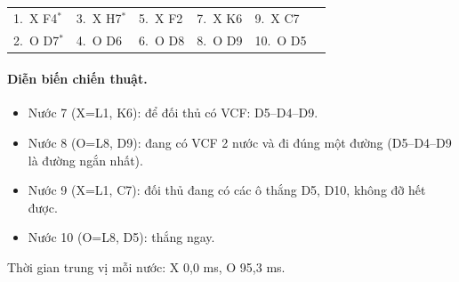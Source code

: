 {\footnotesize\linespread{1}\selectfont
\noindent\begin{tabularx}{\linewidth}{*{6}{X}}
\toprule
1.~X F4$^\ast$ & 3.~X H7$^\ast$ & 5.~X F2 & 7.~X K6 & 9.~X C7 &  \\
2.~O D7$^\ast$ & 4.~O D6 & 6.~O D8 & 8.~O D9 & 10.~O D5 &  \\
\bottomrule
\end{tabularx}\par}
\paragraph{Diễn biến chiến thuật.}
\begin{itemize}\footnotesize\linespread{1.1}\selectfont
\setlength{\itemsep}{0pt}
  \item Nước 7 (X=L1, K6): để đối thủ có VCF: D5--D4--D9.
  \item Nước 8 (O=L8, D9): đang có VCF 2 nước và đi đúng một đường (D5--D4--D9 là đường ngắn nhất).
  \item Nước 9 (X=L1, C7): đối thủ đang có các ô thắng D5, D10, không đỡ hết được.
  \item Nước 10 (O=L8, D5): thắng ngay.
\end{itemize}
Thời gian trung vị mỗi nước: X 0,0 ms, O 95,3 ms.
\clearpage

